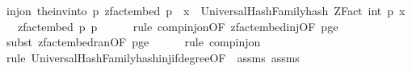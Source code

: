 \begin{isabellebody}
\ {\isachardoublequoteopen}inj{\isacharunderscore}{\kern0pt}on\ {\isacharparenleft}{\kern0pt}the{\isacharunderscore}{\kern0pt}inv{\isacharunderscore}{\kern0pt}into\ {\isacharbraceleft}{\kern0pt}{}{\isachardot}{\kern0pt}{\isachardot}{\kern0pt}{\isacharless}{\kern0pt}p{\isacharbraceright}{\kern0pt}\ {\isacharparenleft}{\kern0pt}zfact{\isacharunderscore}{\kern0pt}embed\ p{\isacharparenright}{\kern0pt}\ {\isasymcirc}\ {\isacharparenleft}{\kern0pt}{\isasymlambda}x{\isachardot}{\kern0pt}\ \ {\isacharparenleft}{\kern0pt}UniversalHashFamily{\isachardot}{\kern0pt}hash\ {\isacharparenleft}{\kern0pt}ZFact\ {\isacharparenleft}{\kern0pt}int\ p{\isacharparenright}{\kern0pt}{\isacharparenright}{\kern0pt}\ x\ {\isasymomega}{\isacharparenright}{\kern0pt}{\isacharparenright}{\kern0pt}\ {\isasymcirc}\ {\isacharparenleft}{\kern0pt}zfact{\isacharunderscore}{\kern0pt}embed\ p{\isacharparenright}{\kern0pt}{\isacharparenright}{\kern0pt}\ {\isacharbraceleft}{\kern0pt}{}{\isachardot}{\kern0pt}{\isachardot}{\kern0pt}{\isacharless}{\kern0pt}p{\isacharbraceright}{\kern0pt}{\isachardoublequoteclose}\isanewline
\ \ \ \ \isamarkupfalse%
\ {\isacharparenleft}{\kern0pt}rule\ comp{\isacharunderscore}{\kern0pt}inj{\isacharunderscore}{\kern0pt}on{\isacharbrackleft}{\kern0pt}OF\ zfact{\isacharunderscore}{\kern0pt}embed{\isacharunderscore}{\kern0pt}inj{\isacharbrackleft}{\kern0pt}OF\ p{\isacharunderscore}{\kern0pt}ge{\isacharunderscore}{\kern0pt}{}{\isacharbrackright}{\kern0pt}{\isacharbrackright}{\kern0pt}{\isacharparenright}{\kern0pt}\isanewline
\ \ \ \ \isamarkupfalse%
\ {\isacharparenleft}{\kern0pt}subst\ zfact{\isacharunderscore}{\kern0pt}embed{\isacharunderscore}{\kern0pt}ran{\isacharbrackleft}{\kern0pt}OF\ p{\isacharunderscore}{\kern0pt}ge{\isacharunderscore}{\kern0pt}{}{\isacharbrackright}{\kern0pt}{\isacharparenright}{\kern0pt}\isanewline
\ \ \ \ \isamarkupfalse%
\ {\isacharparenleft}{\kern0pt}rule\ comp{\isacharunderscore}{\kern0pt}inj{\isacharunderscore}{\kern0pt}on{\isacharparenright}{\kern0pt}\isanewline
\ \ \ \ \ \isamarkupfalse%
\ {\isacharparenleft}{\kern0pt}rule\ UniversalHashFamily{\isachardot}{\kern0pt}hash{\isacharunderscore}{\kern0pt}inj{\isacharunderscore}{\kern0pt}if{\isacharunderscore}{\kern0pt}degree{\isacharunderscore}{\kern0pt}{}{\isacharbrackleft}{\kern0pt}OF\ {\isacharunderscore}{\kern0pt}\ assms{\isacharparenleft}{\kern0pt}{}{\isacharparenright}{\kern0pt}\ assms{\isacharparenleft}{\kern0pt}{}{\isacharparenright}{\kern0pt}{\isacharbrackright}{\kern0pt}{\isacharparenright}{\kern0pt}\isanewline

\end{isabellebody}
